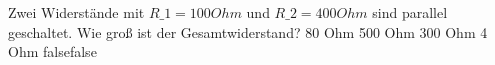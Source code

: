     {Zwei Widerstände mit $R\_1 = 100 Ohm$ und $R\_2 = 400 Ohm$ sind parallel geschaltet. Wie groß ist der Gesamtwiderstand?}
    {80 Ohm}
    {500 Ohm}
    {300 Ohm}
    {4 Ohm}
    {false}{false}